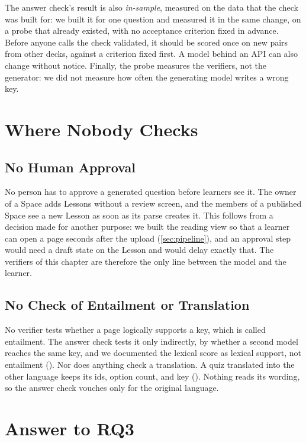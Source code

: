 The answer check's result is also \emph{in-sample}, measured on the data that
the check was built for: we built it for one question and measured it in the
same change, on a probe that already existed, with no acceptance criterion
fixed in advance. Before anyone calls the check validated, it should be scored
once on new pairs from other decks, against a criterion fixed first. A model
behind an API can also change without notice. Finally, the probe measures the
verifiers, not the generator: we did not measure how often the generating model
writes a wrong key.

\section{Where Nobody Checks}
\label{sec:c6-missing}

\subsection{No Human Approval}
\label{sec:review}

No person has to approve a generated question before learners see it. The
owner of a Space adds Lessons without a review screen, and the members of a
published Space see a new Lesson as soon as its parse creates it. This follows
from a decision made for another purpose: we built the reading view so that a
learner can open a page seconds after the upload (\cref{sec:pipeline}), and an
approval step would need a draft state on the Lesson and would delay exactly
that. The verifiers of this chapter are therefore the only line between the
model and the learner.

\subsection{No Check of Entailment or Translation}
\label{sec:c6-gaps}

No verifier tests whether a page logically supports a key, which is called
entailment. The answer check tests it only indirectly, by whether a second
model reaches the same key, and we documented the lexical score as lexical
support, not entailment (). Nor does
anything check a translation. A quiz translated into the other language keeps
its ids, option count, and key ().
Nothing reads its wording, so the answer check vouches only for the original
language.

\section{Answer to RQ3}
\label{sec:c6-answer}

